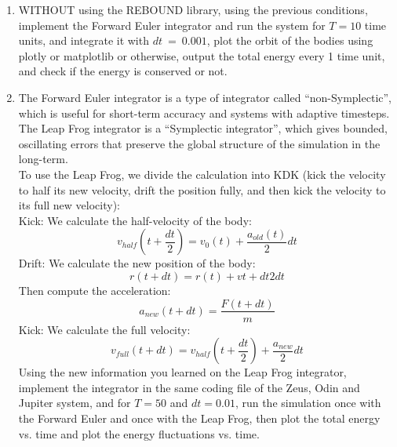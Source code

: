 \documentclass[12pt]{article}
\begin{document}
\begin{enumerate}
    \item 	WITHOUT using the REBOUND library, using the previous conditions, implement the Forward Euler integrator and run the system for $T=10$ time units, and integrate it with $dt\ =\ 0.001$, plot the orbit of the bodies using plotly or matplotlib or otherwise, output the total energy every 1 time unit, and check if the energy is conserved or not.

    \item The Forward Euler integrator is a type of integrator called “non-Symplectic”, which is useful for short-term accuracy and systems with adaptive timesteps. The Leap Frog integrator is a “Symplectic integrator”, which gives bounded, oscillating errors that preserve the global structure of the simulation in the long-term.\\
    To use the Leap Frog, we divide the calculation into KDK (kick the velocity to half its new velocity, drift the position fully, and then kick the velocity to its full new velocity):\\
    Kick: We calculate the half-velocity of the body:
    $$v_{half}\left(t+\frac{dt}{2}\right)=v_0\left(t\right)+\frac{a_{old}(t)}{2}dt$$
    Drift: We calculate the new position of the body:
    $$r\left(t+dt\right)=r\left(t\right)+vt+dt2dt$$
    Then compute the acceleration:
    $$a_{new}\left(t+dt\right)=\frac{F\left(t+dt\right)}{m}$$
    Kick: We calculate the full velocity:
    $$v_{full}(t+dt)=v_{half}\left(t+\frac{dt}{2}\right)+\frac{a_{new}}{2}dt$$
    Using the new information you learned on the Leap Frog integrator, implement the integrator in the same coding file of the Zeus, Odin and Jupiter system, and for $T=50$ and $dt=0.01$, run the simulation once with the Forward Euler and once with the Leap Frog, then plot the total energy vs. time and plot the energy fluctuations vs. time.


\end{enumerate}
\end{document}
